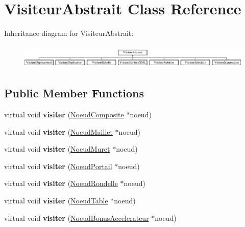 \hypertarget{class_visiteur_abstrait}{}\section{Visiteur\+Abstrait Class Reference}
\label{class_visiteur_abstrait}
Inheritance diagram for Visiteur\+Abstrait\+:\begin{figure}[H]
\begin{center}
\leavevmode
\includegraphics[height=1.176471cm]{class_visiteur_abstrait}
\end{center}
\end{figure}
\subsection*{Public Member Functions}
\begin{DoxyCompactItemize}
\item 
\hypertarget{class_visiteur_abstrait_a4353548a1b7ebd9c79eaa38130384877}{}\label{class_visiteur_abstrait_a4353548a1b7ebd9c79eaa38130384877} 
virtual void {\bfseries visiter} (\hyperlink{class_noeud_composite}{Noeud\+Composite} $\ast$noeud)
\item 
\hypertarget{class_visiteur_abstrait_a2a242fb5887554207429136ef4a9261e}{}\label{class_visiteur_abstrait_a2a242fb5887554207429136ef4a9261e} 
virtual void {\bfseries visiter} (\hyperlink{class_noeud_maillet}{Noeud\+Maillet} $\ast$noeud)
\item 
\hypertarget{class_visiteur_abstrait_ad877d5e1f30cc4517721a1207ebbd53e}{}\label{class_visiteur_abstrait_ad877d5e1f30cc4517721a1207ebbd53e} 
virtual void {\bfseries visiter} (\hyperlink{class_noeud_muret}{Noeud\+Muret} $\ast$noeud)
\item 
\hypertarget{class_visiteur_abstrait_ac3c91dd13a841bb8f3848da00f2c9f4a}{}\label{class_visiteur_abstrait_ac3c91dd13a841bb8f3848da00f2c9f4a} 
virtual void {\bfseries visiter} (\hyperlink{class_noeud_portail}{Noeud\+Portail} $\ast$noeud)
\item 
\hypertarget{class_visiteur_abstrait_acf24ab6866efb049b218a9fe167ead69}{}\label{class_visiteur_abstrait_acf24ab6866efb049b218a9fe167ead69} 
virtual void {\bfseries visiter} (\hyperlink{class_noeud_rondelle}{Noeud\+Rondelle} $\ast$noeud)
\item 
\hypertarget{class_visiteur_abstrait_a2029264db5794afe4ad89a8f441f60b3}{}\label{class_visiteur_abstrait_a2029264db5794afe4ad89a8f441f60b3} 
virtual void {\bfseries visiter} (\hyperlink{class_noeud_table}{Noeud\+Table} $\ast$noeud)
\item 
\hypertarget{class_visiteur_abstrait_a12e745b116e551d010e5564a39741e1c}{}\label{class_visiteur_abstrait_a12e745b116e551d010e5564a39741e1c} 
virtual void {\bfseries visiter} (\hyperlink{class_noeud_bonus_accelerateur}{Noeud\+Bonus\+Accelerateur} $\ast$noeud)
\end{DoxyCompactItemize}
